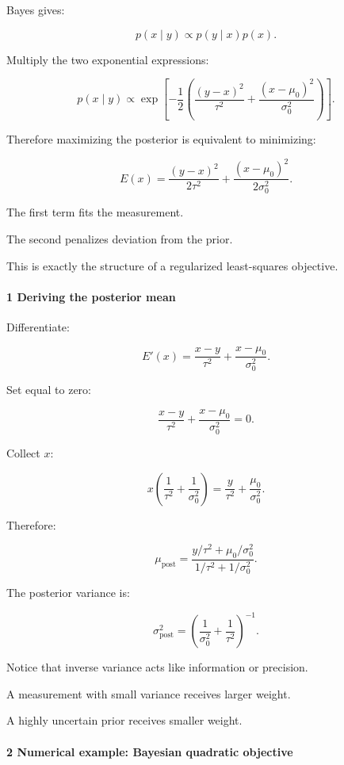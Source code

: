 Bayes gives:

\[
 p(x\mid y)\propto p(y\mid x)p(x).
\]

Multiply the two exponential expressions:

\[
 p(x\mid y) \propto \exp\left[ -\frac12 \left( \frac{(y-x)^2}{\tau^2} + \frac{(x-\mu_0)^2}{\sigma_0^2} \right) \right].
\]

Therefore maximizing the posterior is equivalent to minimizing:

\[
 \boxed{ E(x)= \frac{(y-x)^2}{2\tau^2} + \frac{(x-\mu_0)^2}{2\sigma_0^2} }.
\]

The first term fits the measurement.

The second penalizes deviation from the prior.

This is exactly the structure of a regularized least-squares objective.

\paragraph{1 Deriving the posterior mean}\label{deriving-the-posterior-mean}

Differentiate:

\[
 E'(x)= \frac{x-y}{\tau^2} + \frac{x-\mu_0}{\sigma_0^2}.
\]

Set equal to zero:

\[
 \frac{x-y}{\tau^2} + \frac{x-\mu_0}{\sigma_0^2} =0.
\]

Collect \(x\):

\[
 x\left( \frac1{\tau^2} +\frac1{\sigma_0^2} \right) = \frac y{\tau^2} +\frac{\mu_0}{\sigma_0^2}.
\]

Therefore:

\[
 \boxed{ \mu_{\mathrm{post}} = \frac{ y/\tau^2+\mu_0/\sigma_0^2 }{ 1/\tau^2+1/\sigma_0^2 } }.
\]

The posterior variance is:

\[
 \boxed{ \sigma_{\mathrm{post}}^2 = \left( \frac1{\sigma_0^2} +\frac1{\tau^2} \right)^{-1} }.
\]

Notice that inverse variance acts like information or precision.

A measurement with small variance receives larger weight.

A highly uncertain prior receives smaller weight.

\paragraph{2 Numerical example: Bayesian quadratic objective}\label{numerical-example-bayesian-quadratic-objective}

